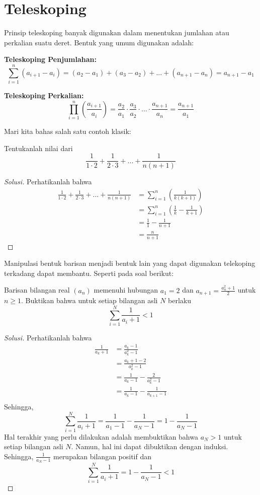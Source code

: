 \documentclass[11pt]{scrartcl}
\begin{document}
\section{Teleskoping}

Prinsip teleskoping banyak digunakan dalam menentukan jumlahan atau perkalian suatu deret. Bentuk yang umum digunakan adalah:

\textbf{Teleskoping Penjumlahan:} \[\sum_{i=1}^n \left(a_{i+1} - a_i\right) = (a_2 - a_1) + (a_3 - a_2) + ... + (a_{n+1} - a_n) = a_{n+1} - a_1 \]

\textbf{Teleskoping Perkalian:} \[\prod_{i=1}^n \left(\frac{a_{i+1}}{a_i}\right) = \frac{a_2}{a_1} \cdot \frac{a_3}{a_2} \cdot ... \cdot \frac{a_{n+1}}{a_n} = \frac{a_{n+1}}{a_1}\]

Mari kita bahas salah satu contoh klasik:
\begin{example}
Tentukanlah nilai dari \[\frac{1}{1\cdot 2} + \frac{1}{2\cdot 3} + ... + \frac{1}{n(n+1)}\]
\end{example}

\begin{proof}[Solusi]
Perhatikanlah bahwa 
\begin{align*}
    \frac{1}{1\cdot 2} + \frac{1}{2\cdot 3} + ... + \frac{1}{n(n+1)} &= \sum_{i=1}^{n} \left(\frac{1}{k(k+1)}\right)\\
    &= \sum_{i=1}^{n} \left(\frac{1}{k} - \frac{1}{k+1}\right)\\
    &= \frac{1}{1} - \frac{1}{n+1}\\
    &= \frac{n}{n+1}
\end{align*}
\end{proof}

Manipulasi bentuk barisan menjadi bentuk lain yang dapat digunakan telekoping terkadang dapat membantu. Seperti pada soal berikut:
\begin{example}
     Barisan bilangan real $(a_n)$ memenuhi hubungan $a_1 = 2$ dan $a_{n+1} = \frac{a_n^2 + 1}{2}$ untuk $n\geq 1$. Buktikan bahwa untuk setiap bilangan asli $N$ berlaku \[\sum_{i=1}^N \frac{1}{a_i + 1} < 1\]
\end{example}

\begin{proof}[Solusi]
Perhatikanlah bahwa
\begin{align*}
    \frac{1}{a_k + 1} &= \frac{a_k - 1}{a_k^2 - 1}\\
    &= \frac{a_k + 1 - 2}{a_k^2 - 1}\\
    &= \frac{1}{a_k - 1} - \frac{2}{a_k^2 - 1}\\
    &= \frac{1}{a_k - 1} - \frac{1}{a_{k+1} - 1}\\
\end{align*}
Sehingga, \[\sum_{i=1}^N \frac{1}{a_i + 1} = \frac{1}{a_1 - 1} - \frac{1}{a_N - 1} = 1 - \frac{1}{a_N - 1}\]
Hal terakhir yang perlu dilakukan adalah membuktikan bahwa $a_N > 1$ untuk setiap bilangan asli $N$. Namun, hal ini dapat dibuktikan dengan induksi. Sehingga, $\frac{1}{a_N - 1}$ merupakan bilangan positif dan \[\sum_{i=1}^N \frac{1}{a_i + 1} = 1 - \frac{1}{a_N - 1} < 1\]    
\end{proof}
\end{document}
